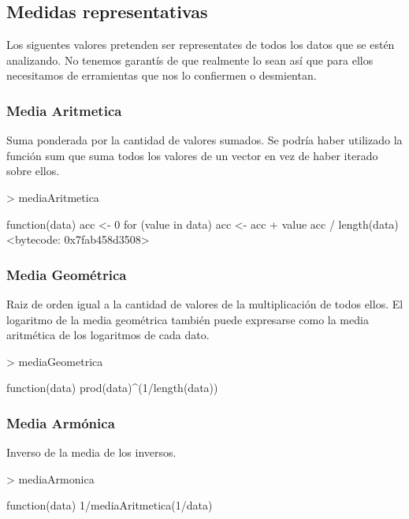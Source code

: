 \documentclass [a4paper] {article}
\begin{document}
\subsection{Medidas representativas}
Los siguentes valores pretenden ser representates de todos los datos que se estén analizando.
No tenemos garantís de que realmente lo sean así que para ellos necesitamos de erramientas que nos lo confiermen o desmientan.
\subsubsection{Media Aritmetica}
Suma ponderada por la cantidad de valores sumados.
Se podría haber utilizado la función sum que suma todos los valores de un vector en vez de haber iterado sobre ellos.
\begin{Schunk}
\begin{Sinput}
> mediaAritmetica
\end{Sinput}
\begin{Soutput}
function(data){
  acc <- 0
  for (value in data) {
    acc <- acc + value
  }
  acc / length(data)
}
<bytecode: 0x7fab458d3508>
\end{Soutput}
\end{Schunk}
\subsubsection{Media Geométrica}
Raiz de orden igual a la cantidad de valores de la multiplicación de todos ellos.
El logaritmo de la media geométrica también puede expresarse como la media aritmética de los logaritmos de cada dato.
\begin{Schunk}
\begin{Sinput}
> mediaGeometrica
\end{Sinput}
\begin{Soutput}
function(data){
  prod(data)^(1/length(data))
}
\end{Soutput}
\end{Schunk}
\subsubsection{Media Armónica}
Inverso de la media de los inversos.
\begin{Schunk}
\begin{Sinput}
> mediaArmonica
\end{Sinput}
\begin{Soutput}
function(data){
  1/mediaAritmetica(1/data)
}
\end{Soutput}
\end{Schunk}
\end{document}

